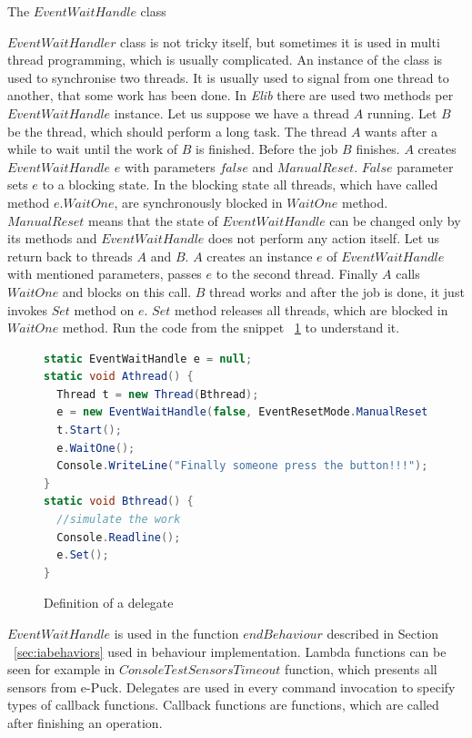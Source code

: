   \begin{definition}[$EventWaitHandle$]
  The $EventWaitHandle$ class 
  \end{definition}
  $EventWaitHandler$ class is not tricky itself, but sometimes it is used in multi thread programming, which is usually complicated.
  An instance of the class is used to synchronise two threads. It is usually used to signal from one thread to another, 
  that some work has been done. In {\it Elib} there are used two methods per~$EventWaitHandle$ instance.
  Let us suppose we have a thread $A$ running. Let $B$ be the thread, which should perform a long task. 
  The thread $A$ wants after a while to wait until the work of $B$ is finished.
  Before the job $B$ finishes. $A$ creates $EventWaitHandle$ $e$ with parameters $false$ and $ManualReset$. 
  $False$ parameter sets $e$ to a blocking state. In the blocking state all threads, which have called method $e.WaitOne$, 
  are synchronously blocked in $WaitOne$ method. $ManualReset$ means that the state of $EventWaitHandle$ 
  can be changed only by its methods and $EventWaitHandle$ does not perform any action itself.
  Let us return back to threads $A$ and $B$. $A$ creates an instance $e$ of $EventWaitHandle$ with mentioned parameters, 
  passes $e$ to the second thread. 
  Finally $A$ calls $WaitOne$ and blocks on this call.
  $B$ thread works and after the job is done, it just invokes $Set$ method on $e$. 
  $Set$ method releases all threads, which are blocked in $WaitOne$ method.
  Run the code from the snippet ~\ref{ewh} to understand it.

          
\begin{figure}[!hbp]
\begin{lstlisting}[language=cs]
static EventWaitHandle e = null;
static void Athread() {
  Thread t = new Thread(Bthread);
  e = new EventWaitHandle(false, EventResetMode.ManualReset);
  t.Start();
  e.WaitOne();
  Console.WriteLine("Finally someone press the button!!!");
}
static void Bthread() {
  //simulate the work      
  Console.Readline();
  e.Set();
}
\end{lstlisting}
\caption{Definition of a delegate} \label{ewh}
\end{figure}

   $EventWaitHandle$ is used in the function $endBehaviour$ described in Section ~\ref{sec:iabehaviors} 
   used in behaviour implementation.
   Lambda functions can be seen for example in $ConsoleTestSensorsTimeout$ function, which presents all sensors from e-Puck.
   Delegates are used in every command invocation to specify types of callback functions.
   Callback functions are functions, which are called after finishing an operation. 
  
